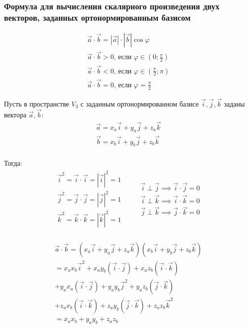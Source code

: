 \subsubsection{Формула для вычисления скалярного произведения двух векторов, заданных ортонормированным базисом}

\begin{gather*}
  \vec{a} \cdot \vec{b} = |\vec{a}| \cdot |\vec{b}| \cos \varphi \\
  \vec{a} \cdot \vec{b} > 0 \text{, если } \varphi \in \left( 0; \frac{\pi}{2} \right)  \\
  \vec{a} \cdot \vec{b} < 0 \text{, если } \varphi \in \left( \frac{\pi}{2}; \pi \right) \\
  \vec{a} \cdot \vec{b} = 0 \text{, если } \varphi = \frac{\pi}{2}
\end{gather*}

Пусть в пространстве $V_3$ с заданным ортонормированном базисе $\vec{i}, \vec{j}, \vec{k}$ заданы вектора $\vec{a}, \vec{b}$:
\begin{gather*}
  \vec{a} = x_a \vec{i} + y_a \vec{j} + z_a \vec{k} \\
  \vec{b} = x_b \vec{i} + y_b \vec{j} + z_b \vec{k} \\
\end{gather*}

Тогда:
\begin{gather*}
  \begin{matrix}
    \vec{i}^2 = \vec{i} \cdot \vec{i} = |\vec{i}|^2 = 1 \\
    \vec{j}^2 = \vec{j} \cdot \vec{j} = |\vec{j}|^2 = 1 \\ 
    \vec{k}^2 = \vec{k} \cdot \vec{k} = |\vec{k}|^2 = 1 \\
  \end{matrix}
  \qquad 
  \begin{matrix}
    \vec{i} \perp \vec{j} \implies \vec{i} \cdot \vec{j} = 0 \\ 
    \vec{i} \perp \vec{k} \implies \vec{i} \cdot \vec{k} = 0 \\ 
    \vec{j} \perp \vec{k} \implies \vec{j} \cdot \vec{k} = 0 \\ 
  \end{matrix}
\end{gather*}

\begin{gather*}
  \vec{a} \cdot \vec{b}
  = \left( x_a \vec{i} + y_a \vec{j} + z_a \vec{k} \right) \left( x_b \vec{i} + y_b \vec{j} + z_b \vec{k} \right) \\
  = x_a x_b \vec{i}^2 + x_a y_b (\vec{i} \cdot \vec{j}) + x_a z_b (\vec{i} \cdot \vec{k}) \\
  + y_a x_a (\vec{i} \cdot \vec{j}) + y_a y_b \vec{j}^2 + y_a z_b (\vec{j} \cdot \vec{k}) \\
  + z_a x_b (\vec{i} \cdot \vec{k}) + z_a y_b (\vec{j} \cdot \vec{k}) + z_a z_b \vec{k}^2 \\
  = x_a x_b + y_a y_b + z_a z_b \\
\end{gather*}

